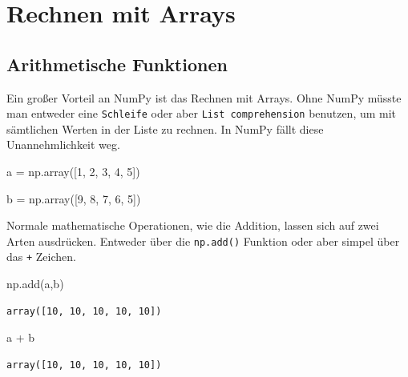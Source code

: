 \documentclass[
  letterpaper,
  DIV=11,
  numbers=noendperiod]{scrreprt}
\newenvironment{Shaded}{\begin{snugshade}}{\end{snugshade}}
\newcommand{\DecValTok}[1]{\textcolor[rgb]{0.68,0.00,0.00}{#1}}
\newcommand{\NormalTok}[1]{\textcolor[rgb]{0.00,0.23,0.31}{#1}}
\newcommand{\OperatorTok}[1]{\textcolor[rgb]{0.37,0.37,0.37}{#1}}
\begin{document}
\chapter{Rechnen mit Arrays}\label{rechnen-mit-arrays}

\section{Arithmetische Funktionen}\label{arithmetische-funktionen}

Ein großer Vorteil an NumPy ist das Rechnen mit Arrays. Ohne NumPy
müsste man entweder eine \texttt{Schleife} oder aber
\texttt{List\ comprehension} benutzen, um mit sämtlichen Werten in der
Liste zu rechnen. In NumPy fällt diese Unannehmlichkeit weg.

\begin{Shaded}
\begin{Highlighting}[]
\NormalTok{a }\OperatorTok{=}\NormalTok{ np.array([}\DecValTok{1}\NormalTok{, }\DecValTok{2}\NormalTok{, }\DecValTok{3}\NormalTok{, }\DecValTok{4}\NormalTok{, }\DecValTok{5}\NormalTok{])}

\NormalTok{b }\OperatorTok{=}\NormalTok{ np.array([}\DecValTok{9}\NormalTok{, }\DecValTok{8}\NormalTok{, }\DecValTok{7}\NormalTok{, }\DecValTok{6}\NormalTok{, }\DecValTok{5}\NormalTok{])}
\end{Highlighting}
\end{Shaded}

Normale mathematische Operationen, wie die Addition, lassen sich auf
zwei Arten ausdrücken. Entweder über die \texttt{np.add()} Funktion oder
aber simpel über das \texttt{+} Zeichen.

\begin{Shaded}
\begin{Highlighting}[]
\NormalTok{np.add(a,b)}
\end{Highlighting}
\end{Shaded}

\begin{verbatim}
array([10, 10, 10, 10, 10])
\end{verbatim}

\begin{Shaded}
\begin{Highlighting}[]
\NormalTok{a }\OperatorTok{+}\NormalTok{ b}
\end{Highlighting}
\end{Shaded}

\begin{verbatim}
array([10, 10, 10, 10, 10])
\end{verbatim}
\end{document}
